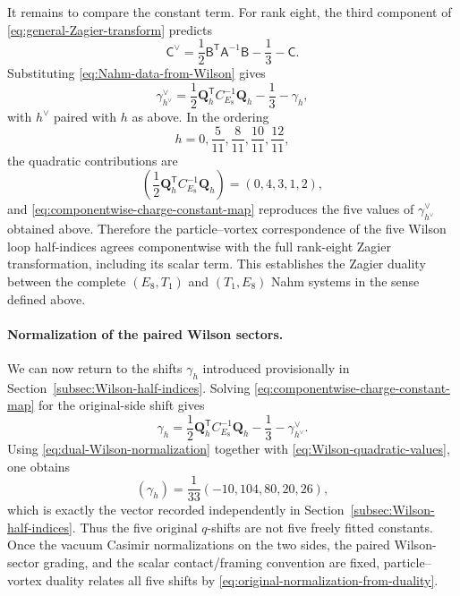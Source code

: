 \documentclass[11pt,a4paper]{article}
\numberwithin{equation}{section}
\begin{document}
It remains to compare the constant term.  For rank eight, the third component of \eqref{eq:general-Zagier-transform} predicts
\begin{equation}
  \mathsf C^\vee
  =\frac12\mathsf B^{\mathsf T}\mathsf A^{-1}\mathsf B
  -\frac13-\mathsf C.
  \label{eq:rank-eight-Zagier-transform}
\end{equation}
Substituting \eqref{eq:Nahm-data-from-Wilson} gives
\begin{equation}
  \gamma_{h^\vee}^\vee
  =\frac12\boldsymbol Q_h^{\mathsf T}C_{E_8}^{-1}\boldsymbol Q_h
  -\frac13-\gamma_h,
  \label{eq:componentwise-charge-constant-map}
\end{equation}
with $h^\vee$ paired with $h$ as above.  In the ordering
\begin{equation}
  h=0,\frac5{11},\frac8{11},\frac{10}{11},\frac{12}{11},
\end{equation}
the quadratic contributions are
\begin{equation}
  \left(
  \frac12\boldsymbol Q_h^{\mathsf T}C_{E_8}^{-1}\boldsymbol Q_h
  \right)
  =(0,4,3,1,2),
  \label{eq:Wilson-quadratic-values}
\end{equation}
and \eqref{eq:componentwise-charge-constant-map} reproduces the five values of $\gamma_{h^\vee}^\vee$ obtained above.  Therefore the particle--vortex correspondence of the five Wilson loop half-indices agrees componentwise with the full rank-eight Zagier transformation, including its scalar term.  This establishes the Zagier duality between the complete $(E_8,T_1)$ and $(T_1,E_8)$ Nahm systems in the sense defined above.

\paragraph{Normalization of the paired Wilson sectors.}
We can now return to the shifts $\gamma_h$ introduced provisionally in Section~\ref{subsec:Wilson-half-indices}.  Solving \eqref{eq:componentwise-charge-constant-map} for the original-side shift gives
\begin{equation}
  \gamma_h
  =\frac12\boldsymbol Q_h^{\mathsf T}C_{E_8}^{-1}\boldsymbol Q_h
  -\frac13-\gamma_{h^\vee}^\vee.
  \label{eq:original-normalization-from-duality}
\end{equation}
Using \eqref{eq:dual-Wilson-normalization} together with \eqref{eq:Wilson-quadratic-values}, one obtains
\begin{equation}
  (\gamma_h)
  =\frac1{33}(-10,104,80,20,26),
  \label{eq:original-normalization-vector-from-duality}
\end{equation}
which is exactly the vector recorded independently in Section~\ref{subsec:Wilson-half-indices}.  Thus the five original $q$-shifts are not five freely fitted constants.  Once the vacuum Casimir normalizations on the two sides, the paired Wilson-sector grading, and the scalar contact/framing convention are fixed, particle--vortex duality relates all five shifts by \eqref{eq:original-normalization-from-duality}.
\end{document}
